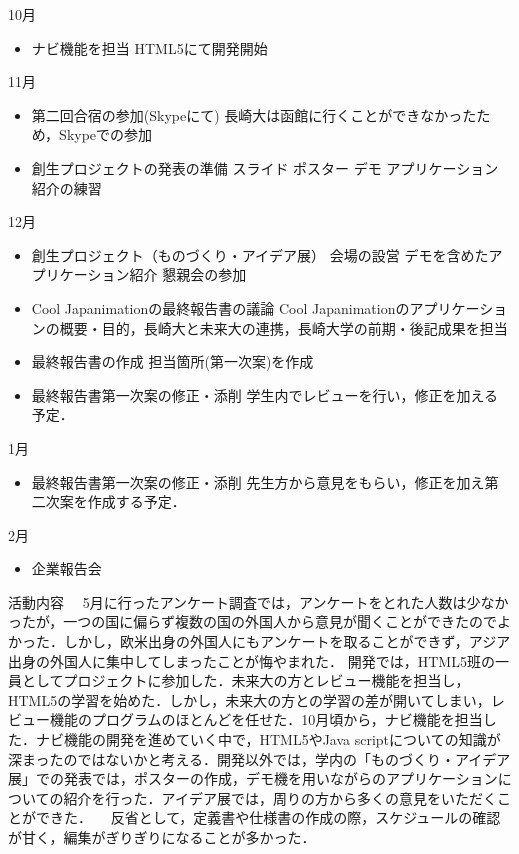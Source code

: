 \par
10月
\begin{itemize}
\item ナビ機能を担当
   HTML5にて開発開始
\end{itemize}
\par
11月
\begin{itemize}
\item 第二回合宿の参加(Skypeにて)
	長崎大は函館に行くことができなかったため，Skypeでの参加
\item 創生プロジェクトの発表の準備
	スライド
	ポスター
	デモ
	アプリケーション紹介の練習
\end{itemize}
\par
12月
\begin{itemize}
\item 創生プロジェクト（ものづくり・アイデア展）
	会場の設営
	デモを含めたアプリケーション紹介
	懇親会の参加
\item Cool Japanimationの最終報告書の議論
Cool Japanimationのアプリケーションの概要・目的，長崎大と未来大の連携，長崎大学の前期・後記成果を担当
\item 最終報告書の作成
	担当箇所(第一次案)を作成
\item 最終報告書第一次案の修正・添削
	学生内でレビューを行い，修正を加える予定．
\end{itemize}
\par
1月
\begin{itemize}
\item 最終報告書第一次案の修正・添削
	先生方から意見をもらい，修正を加え第二次案を作成する予定．
\end{itemize}
\par
2月
\begin{itemize}
\item 企業報告会
\end{itemize}
\par
活動内容
　5月に行ったアンケート調査では，アンケートをとれた人数は少なかったが，一つの国に偏らず複数の国の外国人から意見が聞くことができたのでよかった．しかし，欧米出身の外国人にもアンケートを取ることができず，アジア出身の外国人に集中してしまったことが悔やまれた．
開発では，HTML5班の一員としてプロジェクトに参加した．未来大の方とレビュー機能を担当し，HTML5の学習を始めた．しかし，未来大の方との学習の差が開いてしまい，レビュー機能のプログラムのほとんどを任せた．10月頃から，ナビ機能を担当した．ナビ機能の開発を進めていく中で，HTML5やJava scriptについての知識が深まったのではないかと考える．開発以外では，学内の「ものづくり・アイデア展」での発表では，ポスターの作成，デモ機を用いながらのアプリケーションについての紹介を行った．アイデア展では，周りの方から多くの意見をいただくことができた．
　反省として，定義書や仕様書の作成の際，スケジュールの確認が甘く，編集がぎりぎりになることが多かった．

